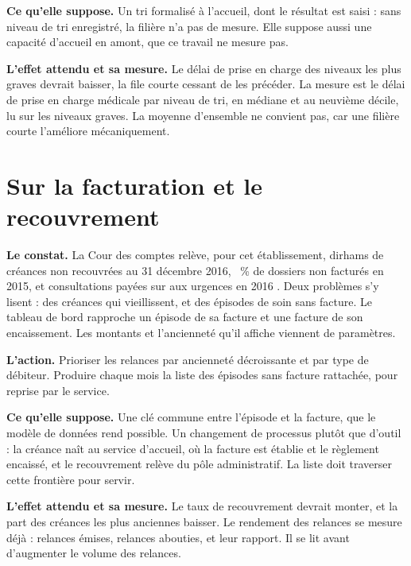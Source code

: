 \textbf{Ce qu'elle suppose.} Un tri formalisé à l'accueil, dont le résultat est saisi : sans niveau de
tri enregistré, la filière n'a pas de mesure. Elle suppose aussi une capacité d'accueil en amont, que
ce travail ne mesure pas.

\textbf{L'effet attendu et sa mesure.} Le délai de prise en charge des niveaux les plus graves
devrait baisser, la file courte cessant de les précéder. La mesure est le délai de prise en charge
médicale par niveau de tri, en médiane et au neuvième décile, lu sur les niveaux graves. La moyenne
d'ensemble ne convient pas, car une filière courte l'améliore mécaniquement.

\section{Sur la facturation et le recouvrement}

\textbf{Le constat.} La Cour des comptes relève, pour cet établissement,
 dirhams de créances non recouvrées au 31 décembre 2016,
~\% de dossiers non facturés en 2015, et
 consultations payées sur
 aux urgences en 2016 \cite{s20}. Deux problèmes s'y
lisent : des créances qui vieillissent, et des épisodes de soin sans facture. Le tableau de bord
rapproche un épisode de sa facture et une facture de son encaissement. Les montants et l'ancienneté
qu'il affiche viennent de paramètres.

\textbf{L'action.} Prioriser les relances par ancienneté décroissante et par type de débiteur.
Produire chaque mois la liste des épisodes sans facture rattachée, pour reprise par le service.

\textbf{Ce qu'elle suppose.} Une clé commune entre l'épisode et la facture, que le modèle de données
rend possible. Un changement de processus plutôt que d'outil : la créance naît au service d'accueil,
où la facture est établie et le règlement encaissé, et le recouvrement relève du pôle administratif.
La liste doit traverser cette frontière pour servir.

\textbf{L'effet attendu et sa mesure.} Le taux de recouvrement devrait monter, et la part des
créances les plus anciennes baisser. Le rendement des relances se mesure déjà : relances émises,
relances abouties, et leur rapport. Il se lit avant d'augmenter le volume des relances.

